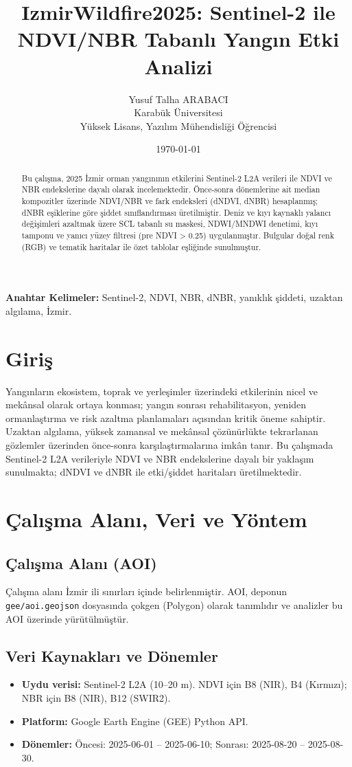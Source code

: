 \documentclass[11pt,a4paper]{article}
\title{IzmirWildfire2025: Sentinel-2 ile NDVI/NBR Tabanlı Yangın Etki Analizi}
\author{Yusuf Talha ARABACI\\Karabük Üniversitesi\\Yüksek Lisans, Yazılım Mühendisliği Öğrencisi}
\date{\today}
\begin{document}
\sloppy
\maketitle
\thispagestyle{empty}

\begin{abstract}
Bu çalışma, 2025 İzmir orman yangınının etkilerini Sentinel-2 L2A verileri ile NDVI ve NBR endekslerine dayalı olarak incelemektedir. Önce-sonra dönemlerine ait median kompozitler üzerinde NDVI/NBR ve fark endeksleri (dNDVI, dNBR) hesaplanmış; dNBR eşiklerine göre şiddet sınıflandırması üretilmiştir. Deniz ve kıyı kaynaklı yalancı değişimleri azaltmak üzere SCL tabanlı su maskesi, NDWI/MNDWI denetimi, kıyı tamponu ve yanıcı yüzey filtresi (pre NDVI > 0.25) uygulanmıştır. Bulgular doğal renk (RGB) ve tematik haritalar ile özet tablolar eşliğinde sunulmuştur.
\end{abstract}

\noindent\textbf{Anahtar Kelimeler:} Sentinel-2, NDVI, NBR, dNBR, yanıklık şiddeti, uzaktan algılama, İzmir.

\clearpage
\tableofcontents
\clearpage


\section{Giriş}
Yangınların ekosistem, toprak ve yerleşimler üzerindeki etkilerinin nicel ve mekânsal olarak ortaya konması; yangın sonrası rehabilitasyon, yeniden ormanlaştırma ve risk azaltma planlamaları açısından kritik öneme sahiptir. Uzaktan algılama, yüksek zamansal ve mekânsal çözünürlükte tekrarlanan gözlemler üzerinden önce-sonra karşılaştırmalarına imkân tanır. Bu çalışmada Sentinel-2 L2A verileriyle NDVI ve NBR endekslerine dayalı bir yaklaşım sunulmakta; dNDVI ve dNBR ile etki/şiddet haritaları üretilmektedir.
\section{Çalışma Alanı, Veri ve Yöntem}
\subsection{Çalışma Alanı (AOI)}
Çalışma alanı İzmir ili sınırları içinde belirlenmiştir. AOI, deponun \texttt{gee/aoi.geojson} dosyasında çokgen (Polygon) olarak tanımlıdır ve analizler bu AOI üzerinde yürütülmüştür.
\subsection{Veri Kaynakları ve Dönemler}
\begin{itemize}
  \item \textbf{Uydu verisi:} Sentinel-2 L2A (10--20 m). NDVI için B8 (NIR), B4 (Kırmızı); NBR için B8 (NIR), B12 (SWIR2).
  \item \textbf{Platform:} Google Earth Engine (GEE) Python API.
  \item \textbf{Dönemler:} Öncesi: 2025-06-01 -- 2025-06-10; Sonrası: 2025-08-20 -- 2025-08-30.
\end{itemize}
\end{document}
